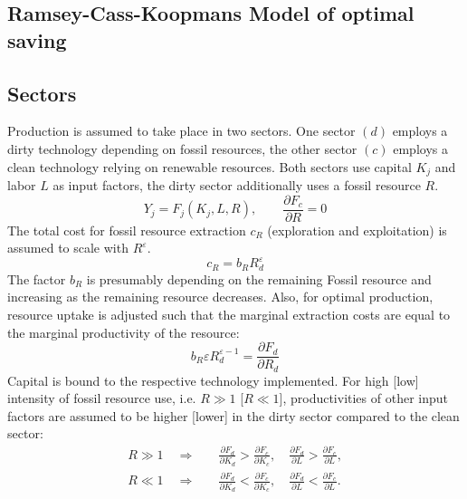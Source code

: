 \subsection{Ramsey-Cass-Koopmans Model of optimal saving}


\subsection{Sectors}

Production is assumed to take place in two sectors. One sector $(d)$ employs a dirty technology depending on fossil resources, the other sector $(c)$ employs a clean technology relying on renewable resources. Both sectors use capital $K_j$ and labor $L$ as input factors, the dirty sector additionally uses a fossil resource $R$.
\begin{equation}
	Y_j = F_j(K_j,L,R), \qquad \frac{\partial F_c}{\partial R} = 0 	
	\label{eq:production}
\end{equation}
The total cost for fossil resource extraction $c_R$ (exploration and exploitation) is assumed to scale with $R^{\varepsilon}$.
\begin{equation}
	c_R = b_R R_d^{\varepsilon}
	\label{resource_extraction_cost}
\end{equation}
The factor $b_R$ is presumably depending on the remaining Fossil resource and increasing as the remaining resource decreases. Also, for optimal production, resource uptake is adjusted such that the marginal extraction costs are equal to the marginal productivity of the resource:
\begin{equation}
	b_R \varepsilon R_{d}^{\varepsilon-1} = \frac{\partial F_d}{\partial R_d}
	\label{marginal_resource_extraction_cost}
\end{equation}
Capital is bound to the respective technology implemented. For high [low] intensity of fossil resource use, i.e. $R \gg 1$ [$R \ll 1$], productivities of other input factors are assumed to be higher [lower] in the dirty sector compared to the clean sector:
\begin{align}
	R \gg 1 \quad \Rightarrow & \quad \frac{\partial F_d}{\partial K_d} > \frac{\partial F_c}{ \partial K_c}, \quad \frac{\partial F_d}{\partial L} > \frac{\partial F_c}{ \partial L}, \\
	R \ll 1 \quad \Rightarrow & \quad \frac{\partial F_d}{\partial K_d} < \frac{\partial F_c}{ \partial K_c}, \quad \frac{\partial F_d}{\partial L} < \frac{\partial F_c}{ \partial L}.
	\label{eq:input_factor_productivities}
\end{align}
